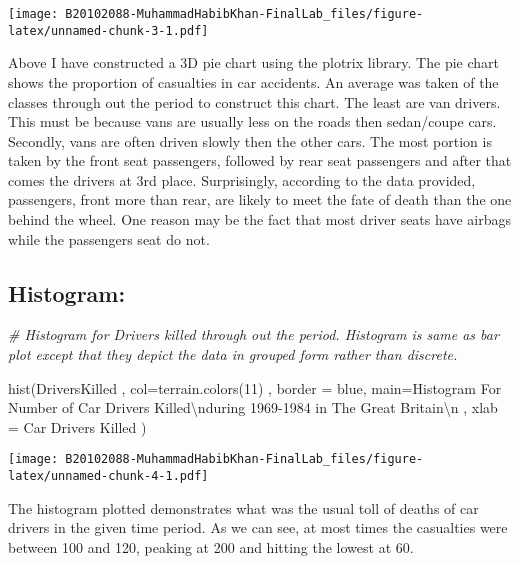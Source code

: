 \documentclass[
]{article}
\newenvironment{Shaded}{\begin{snugshade}}{\end{snugshade}}
\newcommand{\AttributeTok}[1]{\textcolor[rgb]{0.77,0.63,0.00}{#1}}
\newcommand{\CommentTok}[1]{\textcolor[rgb]{0.56,0.35,0.01}{\textit{#1}}}
\newcommand{\DecValTok}[1]{\textcolor[rgb]{0.00,0.00,0.81}{#1}}
\newcommand{\FunctionTok}[1]{\textcolor[rgb]{0.00,0.00,0.00}{#1}}
\newcommand{\NormalTok}[1]{#1}
\newcommand{\SpecialCharTok}[1]{\textcolor[rgb]{0.00,0.00,0.00}{#1}}
\newcommand{\StringTok}[1]{\textcolor[rgb]{0.31,0.60,0.02}{#1}}
\begin{document}
\texttt{[image: B20102088-MuhammadHabibKhan-FinalLab\_files/figure-latex/unnamed-chunk-3-1.pdf]}

Above I have constructed a 3D pie chart using the plotrix library. The
pie chart shows the proportion of casualties in car accidents. An
average was taken of the classes through out the period to construct
this chart. The least are van drivers. This must be because vans are
usually less on the roads then sedan/coupe cars. Secondly, vans are
often driven slowly then the other cars. The most portion is taken by
the front seat passengers, followed by rear seat passengers and after
that comes the drivers at 3rd place. Surprisingly, according to the data
provided, passengers, front more than rear, are likely to meet the fate
of death than the one behind the wheel. One reason may be the fact that
most driver seats have airbags while the passengers seat do not.

\hypertarget{histogram}{%
\subsection{Histogram:}\label{histogram}}

\begin{Shaded}
\begin{Highlighting}[]
\CommentTok{\# Histogram for Drivers killed through out the period. Histogram is same as bar plot except that they depict the data in grouped form rather than discrete. }

\FunctionTok{hist}\NormalTok{(DriversKilled , }\AttributeTok{col=}\FunctionTok{terrain.colors}\NormalTok{(}\DecValTok{11}\NormalTok{) , }\AttributeTok{border =} \StringTok{\textquotesingle{}blue\textquotesingle{}}\NormalTok{, }\AttributeTok{main=}\StringTok{\textquotesingle{}Histogram For Number of Car Drivers Killed}\SpecialCharTok{\textbackslash{}n}\StringTok{during 1969{-}1984 in The Great Britain}\SpecialCharTok{\textbackslash{}n}\StringTok{ \textquotesingle{}}\NormalTok{, }\AttributeTok{xlab =} \StringTok{\textquotesingle{}Car Drivers Killed \textquotesingle{}}\NormalTok{ )}
\end{Highlighting}
\end{Shaded}

\texttt{[image: B20102088-MuhammadHabibKhan-FinalLab\_files/figure-latex/unnamed-chunk-4-1.pdf]}

The histogram plotted demonstrates what was the usual toll of deaths of
car drivers in the given time period. As we can see, at most times the
casualties were between 100 and 120, peaking at 200 and hitting the
lowest at 60.
\end{document}
